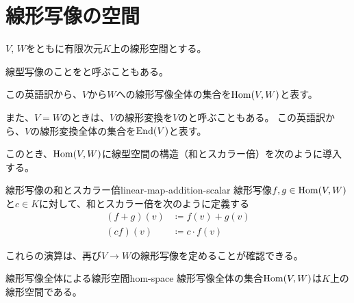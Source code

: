 \documentclass[../../../topic_linear-algebra]{subfiles}
\begin{document}
\sectionline
\section{線形写像の空間}

$V,\,W$をともに有限次元$K$上の線形空間とする。

\br

線型写像のことをと呼ぶこともある。

この英語訳から、$V$から$W$への線形写像全体の集合を$\operatorname{Hom}(V,W)$と表す。

\br

また、$V=W$のときは、$V$の線形変換を$V$のと呼ぶこともある。
この英語訳から、$V$の線形変換全体の集合を$\operatorname{End}(V)$と表す。

\br

このとき、$\operatorname{Hom}(V,W)$に線型空間の構造（和とスカラー倍）を次のように導入する。

\begin{definition}{線形写像の和とスカラー倍}{linear-map-addition-scalar}
  線形写像$f,g\in\operatorname{Hom}(V,W)$と$c\in K$に対して、和とスカラー倍を次のように定義する
  \begin{align*}
    (f+g)(v) & \coloneq f(v) + g(v) \\
    (cf)(v)  & \coloneq c\cdot f(v)
  \end{align*}
\end{definition}

\br

これらの演算は、再び$V \to W$の線形写像を定めることが確認できる。

\begin{theorem}{線形写像全体による線形空間}{hom-space}
  線形写像全体の集合$\operatorname{Hom}(V,W)$は$K$上の線形空間である。
\end{theorem}
\end{document}

